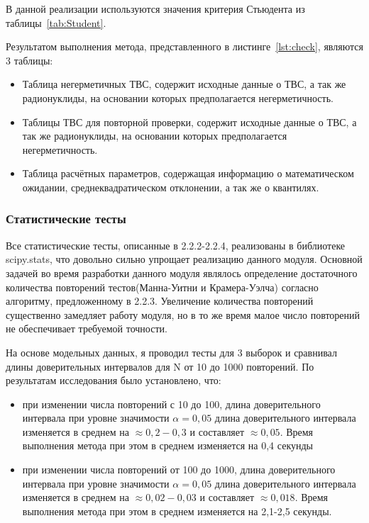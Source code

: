 В данной реализации используются значения критерия Стьюдента из таблицы~\ref{tab:Student}.

Результатом выполнения метода, представленного в листинге~\ref{lst:check}, являются 3 таблицы:

\begin{itemize}
	\item Таблица негерметичных ТВС, содержит исходные данные о ТВС, а так же радионуклиды, на основании которых предполагается негерметичность.
	\item Таблицы ТВС для повторной проверки, содержит исходные данные о ТВС, а так же радионуклиды, на основании которых предполагается негерметичность.
	\item Таблица расчётных параметров, содержащая информацию о математическом ожидании, среднеквадратическом отклонении, а так же о квантилях.
\end{itemize}

\subsubsection{Статистические тесты}

Все статистические тесты, описанные в 2.2.2-2.2.4, реализованы в библиотеке scipy.stats, что довольно сильно упрощает реализацию данного модуля. Основной задачей во время разработки данного модуля являлось определение достаточного количества повторений тестов(Манна-Уитни и Крамера-Уэлча) согласно алгоритму, предложенному в 2.2.3. Увеличение количества повторений существенно замедляет работу модуля, но в то же время малое число повторений не обеспечивает требуемой точности. 

На основе модельных данных, я проводил тесты для 3 выборок и сравнивал длины доверительных интервалов для N от 10 до 1000 повторений. По результатам исследования было установлено, что:
\begin{itemize}
 \item при изменении числа повторений с 10 до 100, длина доверительного интервала при уровне значимости $\alpha = 0,05$ длина доверительного интервала изменяется в среднем на $\approx 0,2-0,3$ и составляет $\approx 0,05$. Время выполнения метода при этом в среднем изменяется на 0,4 секунды
 
 \item при изменении числа повторений от 100 до 1000, длина доверительного интервала при уровне значимости $\alpha = 0,05$ длина доверительного интервала изменяется в среднем на $\approx 0,02-0,03$ и составляет $\approx 0,018$. Время выполнения метода при этом в среднем изменяется на 2,1-2,5 секунды.
 
\end{itemize}

